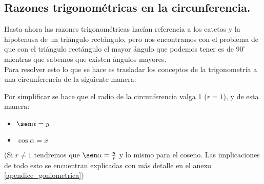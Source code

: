 \documentclass[a4paper,11pt,answers]{exam}
\newcommand{\degree}{^\circ}
\begin{document}
\subsection{Razones trigonométricas en la circunferencia.} \label{razones_circunferencia}
Hasta ahora las razones trigonométricas hacían referencia a los catetos y la hipotenusa de un triángulo rectángulo, pero nos encontramos con el problema de que con el triángulo rectángulo el mayor ángulo que podemos tener es de $90\degree$ mientras que sabemos que existen ángulos mayores.\\
Para resolver esto lo que se hace es trasladar los conceptos de la trigonometría a una circunferencia de la siguiente manera:
\begin{center}
\end{center}
Por simplificar se hace que el radio de la circunferencia valga 1 ($r = 1$), y de esta manera:
\begin{itemize}
\item $\sen \alpha = y$
\item $\cos \alpha = x$
\end{itemize}
(Si $r \neq 1$ tendremos que $\sen \alpha = \frac{y}{r}$ y lo mismo para el coseno.
Las implicaciones de todo esto se encuentran explicadas con más detalle en el anexo
\ref{apendice_goniometrica})
\end{document}
